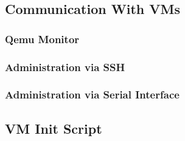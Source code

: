 \subsection{Communication With VMs}
\label{sub-sec:communication-with-vm}

\subsubsection{Qemu Monitor}
\label{sub-sub-sec:qemu-monitor}

\subsubsection{Administration via SSH}
\label{sub-sub-sec:admin-SSH}

\subsubsection{Administration via Serial Interface}
\label{sub-sub-sec:admin-serial}

\subsection{VM Init Script}
\label{sub-sec:vm-init-script}


